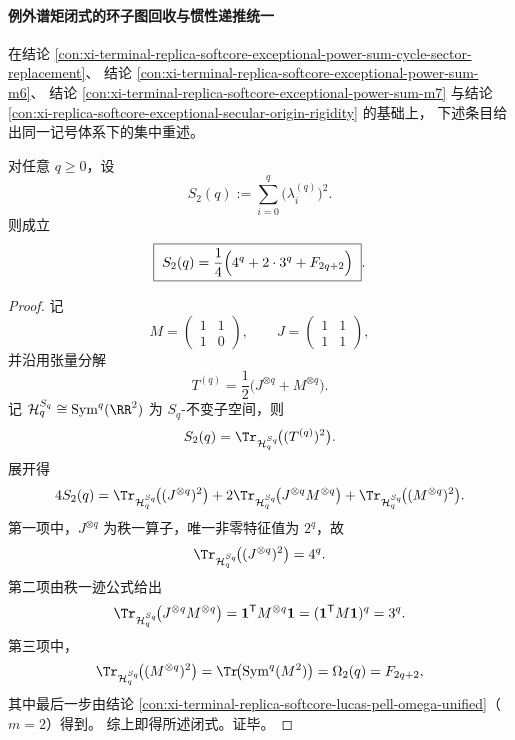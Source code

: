 \paragraph{例外谱矩闭式的环子图回收与惯性递推统一}
在结论 \ref{con:xi-terminal-replica-softcore-exceptional-power-sum-cycle-sector-replacement}、
结论 \ref{con:xi-terminal-replica-softcore-exceptional-power-sum-m6}、
结论 \ref{con:xi-terminal-replica-softcore-exceptional-power-sum-m7}
与结论 \ref{con:xi-replica-softcore-exceptional-secular-origin-rigidity} 的基础上，
下述条目给出同一记号体系下的集中重述。

\begin{theorem}[二次幂和的完全闭式]\label{thm:xi-replica-softcore-exceptional-power-sum-m2-complete-closed}
对任意 \(q\ge 0\)，设
\[
S_2(q):=\sum_{i=0}^{q}\bigl(\lambda_i^{(q)}\bigr)^2.
\]
则成立
\[
\boxed{\;
S_2(q)=\frac14\Bigl(4^q+2\cdot 3^q+F_{2q+2}\Bigr)\; }.
\]
\end{theorem}
\begin{proof}
记
\[
M=\begin{pmatrix}1&1\\[2pt]1&0\end{pmatrix},\qquad
J=\begin{pmatrix}1&1\\[2pt]1&1\end{pmatrix},
\]
并沿用张量分解
\[
T^{(q)}=\frac12\bigl(J^{\otimes q}+M^{\otimes q}\bigr).
\]
记 \(\mathcal H_q^{S_q}\cong\mathrm{Sym}^q(\RR^2)\) 为 \(S_q\)-不变子空间，则
\[
S_2(q)=\Tr_{\mathcal H_q^{S_q}}\!\bigl((T^{(q)})^2\bigr).
\]
展开得
\[
4S_2(q)
=\Tr_{\mathcal H_q^{S_q}}\!\bigl((J^{\otimes q})^2\bigr)
+2\Tr_{\mathcal H_q^{S_q}}\!\bigl(J^{\otimes q}M^{\otimes q}\bigr)
+\Tr_{\mathcal H_q^{S_q}}\!\bigl((M^{\otimes q})^2\bigr).
\]
第一项中，\(J^{\otimes q}\) 为秩一算子，唯一非零特征值为 \(2^q\)，故
\[
\Tr_{\mathcal H_q^{S_q}}\!\bigl((J^{\otimes q})^2\bigr)=4^q.
\]
第二项由秩一迹公式给出
\[
\Tr_{\mathcal H_q^{S_q}}\!\bigl(J^{\otimes q}M^{\otimes q}\bigr)
=\mathbf 1^{\mathsf T}M^{\otimes q}\mathbf 1
=(\mathbf 1^{\mathsf T}M\mathbf 1)^q
=3^q.
\]
第三项中，
\[
\Tr_{\mathcal H_q^{S_q}}\!\bigl((M^{\otimes q})^2\bigr)
=\Tr\!\bigl(\mathrm{Sym}^q(M^2)\bigr)
=\Omega_2(q)
=F_{2q+2},
\]
其中最后一步由结论 \ref{con:xi-terminal-replica-softcore-lucas-pell-omega-unified}（\(m=2\)）得到。
综上即得所述闭式。证毕。
\end{proof}

